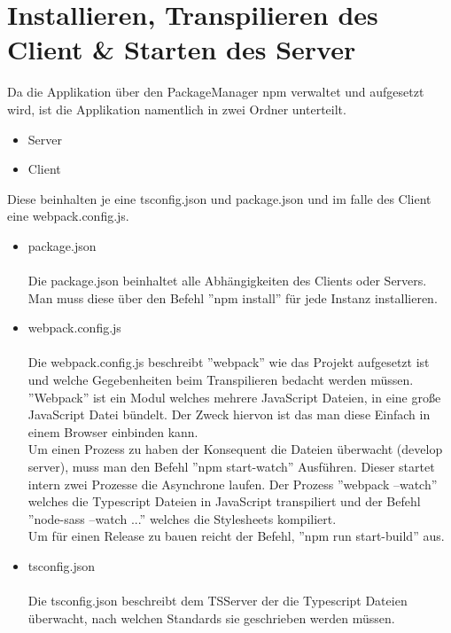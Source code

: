\section{Installieren, Transpilieren des Client \& Starten des Server}
Da die Applikation über den PackageManager npm verwaltet und aufgesetzt wird, ist die Applikation namentlich in zwei Ordner unterteilt.
\begin{itemize}
    \item Server
    \item Client
\end{itemize}
Diese beinhalten je eine tsconfig.json und package.json und im falle des Client eine webpack.config.js.
\begin{itemize}
    \item package.json \\ \\
        Die package.json beinhaltet alle Abhängigkeiten des Clients oder Servers. Man muss diese über den Befehl ''npm install''
        für jede Instanz installieren.
    \newpage
    \item webpack.config.js \\ \\
        Die webpack.config.js beschreibt ''webpack'' wie das Projekt aufgesetzt ist und welche Gegebenheiten beim Transpilieren bedacht werden
        müssen. ''Webpack'' ist ein Modul welches mehrere JavaScript Dateien, in eine große JavaScript Datei bündelt. Der Zweck hiervon ist das man
        diese Einfach in einem Browser einbinden kann. \\
        Um einen Prozess zu haben der Konsequent die Dateien überwacht (develop server), muss man den Befehl ''npm start-watch'' Ausführen.
        Dieser startet intern zwei Prozesse die Asynchrone laufen. Der Prozess ''webpack --watch'' welches die Typescript Dateien in
        JavaScript transpiliert und der Befehl ''node-sass --watch ...'' welches die Stylesheets kompiliert. \\
        Um für einen Release zu bauen reicht der Befehl, ''npm run start-build'' aus.
    \item tsconfig.json \\ \\
        Die tsconfig.json beschreibt dem TSServer der die Typescript Dateien überwacht, nach welchen Standards sie geschrieben werden
        müssen.
\end{itemize}
\newpage

